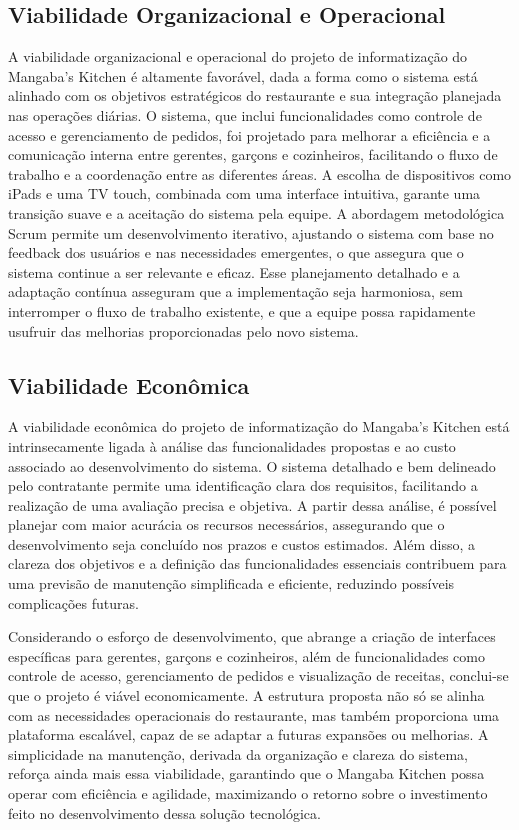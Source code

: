 \hspace{4.5mm}
\subsection {Viabilidade Organizacional e Operacional}
A viabilidade organizacional e operacional do projeto de informatização do Mangaba's Kitchen é altamente favorável, dada a forma como o sistema está alinhado com os objetivos estratégicos do restaurante e sua integração planejada nas operações diárias. O sistema, que inclui funcionalidades como controle de acesso e gerenciamento de pedidos, foi projetado para melhorar a eficiência e a comunicação interna entre gerentes, garçons e cozinheiros, facilitando o fluxo de trabalho e a coordenação entre as diferentes áreas. A escolha de dispositivos como iPads e uma TV touch, combinada com uma interface intuitiva, garante uma transição suave e a aceitação do sistema pela equipe. A abordagem metodológica Scrum permite um desenvolvimento iterativo, ajustando o sistema com base no feedback dos usuários e nas necessidades emergentes, o que assegura que o sistema continue a ser relevante e eficaz. Esse planejamento detalhado e a adaptação contínua asseguram que a implementação seja harmoniosa, sem interromper o fluxo de trabalho existente, e que a equipe possa rapidamente usufruir das melhorias proporcionadas pelo novo sistema.
\subsection {Viabilidade Econômica}
A viabilidade econômica do projeto de informatização do Mangaba's Kitchen está intrinsecamente ligada à análise das funcionalidades propostas e ao custo associado ao desenvolvimento do sistema. O sistema detalhado e bem delineado pelo contratante permite uma identificação clara dos requisitos, facilitando a realização de uma avaliação precisa e objetiva. A partir dessa análise, é possível planejar com maior acurácia os recursos necessários, assegurando que o desenvolvimento seja concluído nos prazos e custos estimados. Além disso, a clareza dos objetivos e a definição das funcionalidades essenciais contribuem para uma previsão de manutenção simplificada e eficiente, reduzindo possíveis complicações futuras.
\par
Considerando o esforço de desenvolvimento, que abrange a criação de interfaces específicas para gerentes, garçons e cozinheiros, além de funcionalidades como controle de acesso, gerenciamento de pedidos e visualização de receitas, conclui-se que o projeto é viável economicamente. A estrutura proposta não só se alinha com as necessidades operacionais do restaurante, mas também proporciona uma plataforma escalável, capaz de se adaptar a futuras expansões ou melhorias. A simplicidade na manutenção, derivada da organização e clareza do sistema, reforça ainda mais essa viabilidade, garantindo que o Mangaba Kitchen possa operar com eficiência e agilidade, maximizando o retorno sobre o investimento feito no desenvolvimento dessa solução tecnológica.
